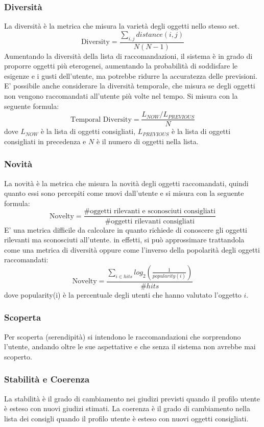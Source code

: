 \documentclass{report}
\begin{document}
	\subsubsection{Diversità}
	La diversità è la metrica che misura la varietà degli oggetti nello stesso set.
	\[
		\text{Diversity} = \frac{\sum_{i,j} distance(i,j)}{N(N-1)}
	\]
	Aumentando la diversità della lista di raccomandazioni, il sistema è in grado di proporre oggetti più eterogenei, aumentando la probabilità di soddisfare le esigenze e i gusti dell'utente, ma potrebbe ridurre la accuratezza delle previsioni.
	E' possibile anche considerare la diversità temporale, che misura se degli oggetti non vengono raccomandati all'utente più volte nel tempo. Si misura con la seguente formula:
	\[
		\text{Temporal Diversity} = \frac{L_{NOW}/L_{PREVIOUS}}{N}
	\]
	dove $L_{NOW}$ è la lista di oggetti consigliati, $L_{PREVIOUS}$ è la lista di oggetti consigliati in precedenza e $N$ è il numero di oggetti nella lista.

	\subsubsection{Novità}
	La novità è la metrica che misura la novità degli oggetti raccomandati, quindi quanto essi sono percepiti come nuovi dall'utente e si misura con la seguente formula:
	\[
		\text{Novelty} = \frac{\text{\# oggetti rilevanti e sconosciuti consigliati}}{\text{\# oggetti rilevanti consigliati}}
	\]
	E' una metrica difficile da calcolare in quanto richiede di conoscere gli oggetti rilevanti ma sconosciuti all'utente. in effetti, si può approssimare trattandola come una metrica di diversità oppure come l'inverso della popolarità degli oggetti raccomandati:
	\[
		\text{Novelty} = \frac{\sum_{i \in hits} log_2(\frac{1}{popularity(i)})}{\# hits}
	\]
	dove popularity(i) è la percentuale degli utenti che hanno valutato l'oggetto $i$.
	
	\subsubsection{Scoperta}
	Per scoperta (serendipità) si intendono le raccomandazioni che sorprendono l'utente, andando oltre le sue aspettative e che senza il sistema non avrebbe mai scoperto. 

	\subsubsection{Stabilità e Coerenza}
	La stabilità è il grado di cambiamento nei giudizi previsti quando il profilo utente è esteso con nuovi giudizi stimati. La coerenza è il grado di cambiamento nella lista dei consigli quando il profilo utente è esteso con nuovi oggetti consigliati.

		
\end{document}
